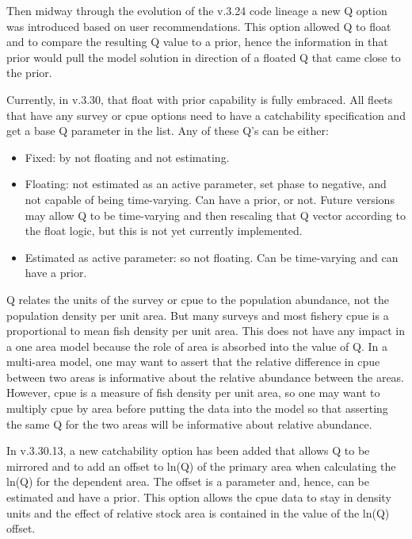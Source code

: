 Then midway through the evolution of the v.3.24 code lineage a new Q option was introduced based on user recommendations. This option allowed Q to float and to compare the resulting Q value to a prior, hence the information in that prior would pull the model solution in direction of a floated Q that came close to the prior.

Currently, in v.3.30, that float with prior capability is fully embraced. All fleets that have any survey or \gls{cpue} options need to have a catchability specification and get a base Q parameter in the list. Any of these Q's can be either:

\begin{itemize}
	\item Fixed: by not floating and not estimating.

	\item Floating: not estimated as an active parameter, set phase to negative, and not capable of being time-varying. Can have a prior, or not. Future versions may allow Q to be time-varying and then rescaling that Q vector according to the float logic, but this is not yet currently implemented.

	\item Estimated as active parameter: so not floating. Can be time-varying and can have a prior.
\end{itemize}


Q relates the units of the survey or \gls{cpue} to the population abundance, not the population density per unit area. But many surveys and most fishery \gls{cpue} is a proportional to mean fish density per unit area. This does not have any impact in a one area model because the role of area is absorbed into the value of Q. In a multi-area model, one may want to assert that the relative difference in \gls{cpue} between two areas is informative about the relative abundance between the areas. However, \gls{cpue} is a measure of fish density per unit area, so one may want to multiply \gls{cpue} by area before putting the data into the model so that asserting the same Q for the two areas will be informative about relative abundance.

In v.3.30.13, a new catchability option has been added that allows Q to be mirrored and to add an offset to ln(Q) of the primary area when calculating the ln(Q) for the dependent area. The offset is a parameter and, hence, can be estimated and have a prior. This option allows the \gls{cpue} data to stay in density units and the effect of relative stock area is contained in the value of the ln(Q) offset.

